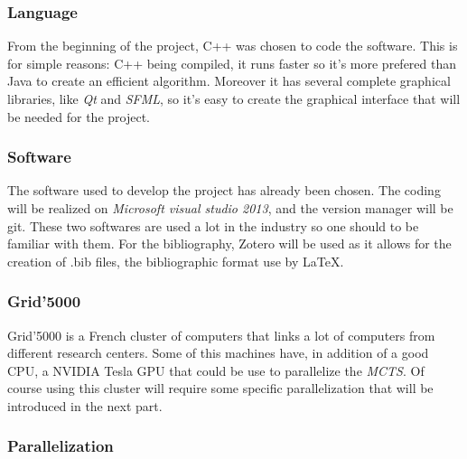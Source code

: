 \label{last part}
\subsubsection{Language}

From the beginning of the project, C++ was chosen to code the software. This is for simple reasons: C++ being compiled, it runs faster so it's more prefered than Java to create an efficient algorithm.  Moreover it has several complete graphical libraries, like \emph{Qt} and \emph{SFML}, so it's easy to create the graphical interface that will be needed for the project.

\subsubsection{Software}

The software used to develop the project has already been chosen. The coding will be realized on \emph{Microsoft visual studio 2013}, and the version manager will be git. These two softwares are used a lot in the industry so one should to be familiar with them.
For the bibliography, Zotero will be used as it allows for the creation of .bib files, the bibliographic format use by LaTeX.

\subsubsection{Grid'5000}

Grid'5000 is a French cluster of computers that links a lot of computers from different research centers. Some of this machines have, in addition of a good CPU, a NVIDIA Tesla GPU that could be use to parallelize the \emph{MCTS}. Of course using this cluster will require some specific parallelization that will be introduced in the next part.

\subsubsection{Parallelization}

